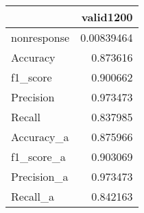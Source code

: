 
\begin{tabular}{lr}
\hline
             &      valid1200 \\
\hline
 nonresponse & 0.00839464 \\
 Accuracy    & 0.873616   \\
 f1_score    & 0.900662   \\
 Precision   & 0.973473   \\
 Recall      & 0.837985   \\
 Accuracy_a  & 0.875966   \\
 f1_score_a  & 0.903069   \\
 Precision_a & 0.973473   \\
 Recall_a    & 0.842163   \\
\hline
\end{tabular}